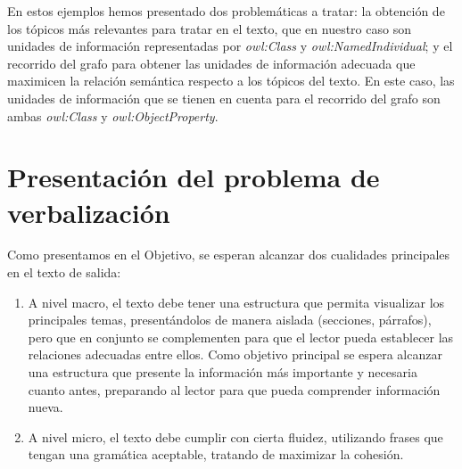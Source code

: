 En estos ejemplos hemos presentado dos problemáticas a tratar: la obtención de los tópicos más relevantes para tratar en el texto, que en nuestro caso son unidades de información representadas por \emph{owl:Class} y \emph{owl:NamedIndividual}; y el recorrido del grafo para obtener las unidades de información adecuada que maximicen la relación semántica respecto a los tópicos del texto. En este caso, las unidades de información que se tienen en cuenta para el recorrido del grafo son ambas \emph{owl:Class} y \emph{owl:ObjectProperty}.
 
\section{Presentación del problema de verbalización}
Como presentamos en el Objetivo, se esperan alcanzar dos cualidades principales en el texto de salida:
\begin{enumerate}
    \item A nivel macro, el texto debe tener una estructura que permita visualizar los principales temas, presentándolos de manera aislada (secciones, párrafos), pero que en conjunto se complementen para que el lector pueda establecer las relaciones adecuadas entre ellos. Como objetivo principal se espera alcanzar una estructura que presente la información más importante y necesaria cuanto antes, preparando al lector para que pueda comprender información nueva.
    \item A nivel micro, el texto debe cumplir con cierta fluidez, utilizando frases que tengan una gramática aceptable, tratando de maximizar la cohesión.
\end{enumerate}{}